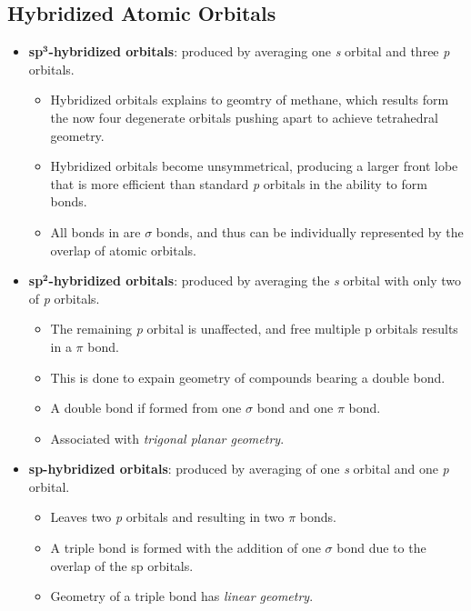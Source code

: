 \documentclass[12pt,a4paper]{article}
\begin{document}
\subsection{Hybridized Atomic Orbitals}
\begin{itemize}
    \item \textbf{sp\(\bm{^3}\)-hybridized orbitals}: produced by averaging one \textit{s} orbital and {\color{o-Sun}three} \textit{p} orbitals.
        \begin{itemize}
            \item Hybridized orbitals explains to geomtry of methane, which results form the {\color{o-Sun}now four degenerate} orbitals pushing apart to achieve tetrahedral geometry.
            \item Hybridized orbitals become {\color{o-Sun}unsymmetrical}, producing a larger front lobe that is more efficient than standard \textit{p} orbitals in the ability to form bonds.
            \item All bonds in are {\color{o-Sun}$\sigma$ bonds}, and thus can be individually represented by the overlap of atomic orbitals.
        \end{itemize}
    \item \textbf{sp\(\bm{^2}\)-hybridized orbitals}: produced by averaging the \textit{s} orbital with only {\color{o-Sun}two} of \textit{p} orbitals.
        \begin{itemize}
            \item The remaining \textit{p} orbital is unaffected, and free multiple p orbitals results in a $\pi$ bond.
            \item This is done to expain geometry of compounds bearing a double bond.
            \item A double bond if formed from one $\sigma$ bond and one $\pi$ bond.
            \item Associated with \textit{trigonal planar geometry}.
        \end{itemize}
    \item \textbf{sp-hybridized orbitals}: produced by averaging of one \textit{s} orbital and {\color{o-Sun}one} \textit{p} orbital.
        \begin{itemize}
            \item Leaves two \textit{p} orbitals and resulting in two $\pi$ bonds.
            \item A triple bond is formed with the addition of one $\sigma$ bond due to the overlap of the sp orbitals.
            \item Geometry of a triple bond has \textit{linear geometry}.

\end{itemize}
\end{itemize}
\end{document}
